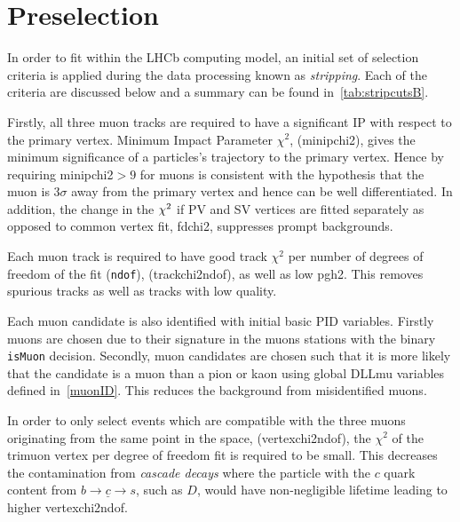 \section{Preselection}%
\label{preselection}

In order to fit within the LHCb computing model, an initial set of selection criteria is applied during the data processing known as \textit{stripping}. Each of the criteria are discussed below and a summary can be found in~\autoref{tab:stripcutsB}.


Firstly, all three muon tracks are required to have a significant \gls{IP} with respect to the primary vertex. Minimum Impact Parameter $\chi^{2}$, (\gls{minipchi2}), gives the minimum significance of a particles's trajectory to the primary vertex. Hence by requiring \gls{minipchi2}$>9$ for muons is consistent with the hypothesis that the muon is $3\sigma$ away from the primary vertex and hence can be well differentiated. In addition, the change in the $\chi^2$ if \gls{PV} and \gls{SV} vertices are fitted separately as opposed to common vertex fit, \gls{fdchi2}, suppresses prompt backgrounds. 

Each muon track is required to have good track $\chi^{2}$ per number of degrees of freedom of the fit (\texttt{ndof}), (\gls{trackchi2ndof}), as well as low \gls{pgh2}. This removes spurious tracks as well as tracks with low quality.

Each muon candidate is also identified with initial basic \gls{PID} variables. Firstly muons are chosen due to their signature in the muons stations with the binary \texttt{isMuon} decision. Secondly, muon candidates are chosen such that it is more likely that the candidate is a muon than a pion or kaon using global DLLmu variables defined in~\autoref{muonID}. This reduces the background from misidentified muons.

In order to only select events which are compatible with the three muons originating from the same point in the space, (\gls{vertexchi2ndof}), the $\chi^{2}$ of the trimuon vertex per degree of freedom fit is required to be small. This decreases the contamination from \textit{cascade decays} where the particle with the $c$ quark content from $b \rightarrow \underline{c} \rightarrow s$, such as $D$, would have non-negligible lifetime leading to higher \gls{vertexchi2ndof}. 


